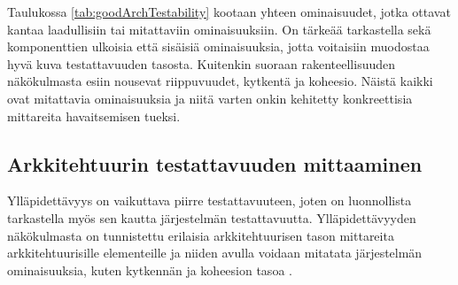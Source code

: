 \documentclass[finnish]{tktltiki2}
\numberwithin{table}{section}
\theoremstyle{definition}
\theoremstyle{remark}
\begin{document}


\begin{table}[H]
	\centering
	\setlength{\extrarowheight}{10pt}%
	\caption{Hyvään testattavuuteen vaikuttavat ominaisuudet jaoteltuna kahteen eri luokaan: laadulliset ja metriset.}
	\label{tab:goodArchTestability}
\end{table}

\noindent
Taulukossa \ref{tab:goodArchTestability} kootaan yhteen ominaisuudet, jotka ottavat kantaa laadullisiin tai mitattaviin ominaisuuksiin. On tärkeää tarkastella sekä komponenttien ulkoisia että sisäisiä ominaisuuksia, jotta voitaisiin muodostaa hyvä kuva testattavuuden tasosta. Kuitenkin suoraan rakenteellisuuden näkökulmasta esiin nousevat riippuvuudet, kytkentä ja koheesio. Näistä kaikki ovat mitattavia ominaisuuksia ja niitä varten onkin kehitetty konkreettisia mittareita havaitsemisen tueksi.  


\subsection{Arkkitehtuurin testattavuuden mittaaminen} \label{arch_testability_measurement}

Ylläpidettävyys on vaikuttava piirre testattavuuteen, joten on luonnollista tarkastella myös sen kautta järjestelmän testattavuutta. Ylläpidettävyyden näkökulmasta on tunnistettu erilaisia arkkitehtuurisen tason mittareita arkkitehtuurisille elementeille ja niiden avulla voidaan mitatata järjestelmän ominaisuuksia, kuten kytkennän ja koheesion tasoa \citep{bengtsson1998towards}.  

\iffalse


\begin{itemize}
	\item metodien määrä elementin rajapinnassa
	\item paikkamerkkien (placeholder) määrä arkkitehtuurisille elementeille, joiden avulla elementti parametrisoidaan
	\item elementistä lähtevien viestien määrä
	\item elementtityyppien määrä, joita tarkasteltava elementti toteuttaa (implement)
	\item elementtien määrä, jotka toteuttavat tarkasteltavan elementin tyypin
	\item saatavilla olevien metodien lukumäärä muista elementeistä, jotka ovat yhteydessä tarkasteltavaan elementtiin
	\item elementin metodien ja parametrien määrä
\end{itemize}
\fi
\end{document}
